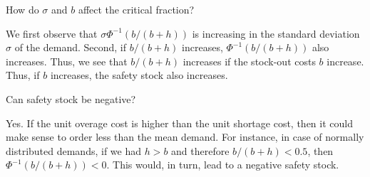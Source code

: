 \begin{exercise}
How do $\sigma$ and $b$ affect the critical fraction?
\begin{solution}
We first observe that $\sigma \Phi^{-1}(b/(b+h))$ is increasing in the standard deviation $\sigma$ of the demand.  Second, if $b/(b+h)$ increases, $\Phi^{-1}(b/(b+h))$ also increases. Thus, we see that $b/(b+h)$ increases if the stock-out costs $b$ increase. Thus, if $b$ increases, the safety stock also increases.
\end{solution}
\end{exercise}

\begin{exercise}
Can safety stock be negative?


\begin{solution}
Yes. If the unit overage cost is higher than the unit shortage cost, then it could make sense to order less than the mean demand. For instance, in case of normally distributed demands, if we had $h>b$ and therefore $b/(b+h)<0.5$, then $\Phi^{-1}(b/(b+h))<0$. This would, in turn, lead to a negative safety stock. 
\end{solution}
\end{exercise}








